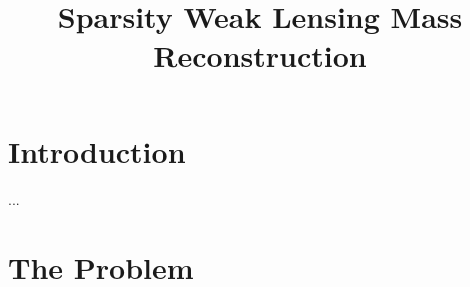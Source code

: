\documentclass[twocolumn]{aastex62}
\begin{document}
\title{Sparsity Weak Lensing Mass Reconstruction}




\begin{abstract}

\end{abstract}

\section{Introduction}
...
\section{The Problem}
\end{document}
